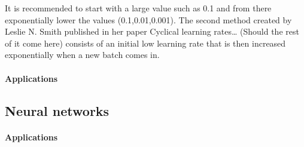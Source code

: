 It is recommended to start with a large value such as 0.1 and from there exponentially lower the values (0.1,0.01,0.001).
The second method created by Leslie N. Smith published in her paper Cyclical learning rates… (Should the rest of it come here) consists of an initial low learning rate that is then increased exponentially when a new batch comes in.


\paragraph{Applications}



\subsection{Neural networks}


\paragraph{Applications}




\endinput

